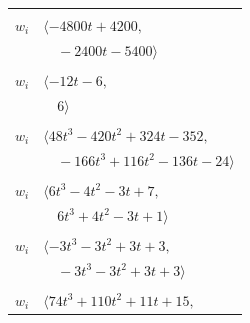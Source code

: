 \documentclass[11pt]{article}
\begin{document}
\begin{longtable}{@{}ll@{}}
\addlinespace[2pt]
\multicolumn{2}{@{}p{0.97\textwidth}@{}}{$i=38$, $D_i=16$, $e_i=0$, $\rho_{ij}$: $7{:}3, \allowbreak 9{:}2, \allowbreak 35{:}3, \allowbreak 36{:}2, \allowbreak 40{:}2, \allowbreak 46{:}3$}\\
$w_i$ & $\langle -4800t+4200,$\\
 & $\quad -2400t-5400\rangle$\\
\addlinespace[2pt]
\multicolumn{2}{@{}p{0.97\textwidth}@{}}{$i=39$, $D_i=1$, $\rho_{ij}$: $0{:}1, \allowbreak 17{:}1, \allowbreak 28{:}1, \allowbreak 31{:}2, \allowbreak 37{:}1, \allowbreak 42{:}1, \allowbreak 43{:}2, \allowbreak 45{:}3$}\\
$w_i$ & $\langle -12t-6,$\\
 & $\quad 6\rangle$\\
\addlinespace[2pt]
\multicolumn{2}{@{}p{0.97\textwidth}@{}}{$i=40$, $D_i=1$, $\rho_{ij}$: $2{:}2, \allowbreak 6{:}3, \allowbreak 17{:}1, \allowbreak 19{:}1, \allowbreak 20{:}3, \allowbreak 23{:}3, \allowbreak 24{:}2, \allowbreak 27{:}3, \allowbreak 30{:}1, \allowbreak 37{:}3, \allowbreak 38{:}2, \allowbreak 46{:}2$}\\
$w_i$ & $\langle 48t^{3}-420t^{2}+324t-352,$\\
 & $\quad -166t^{3}+116t^{2}-136t-24\rangle$\\
\addlinespace[2pt]
\multicolumn{2}{@{}p{0.97\textwidth}@{}}{$i=41$, $D_i=1$, $\rho_{ij}$: $15{:}1, \allowbreak 18{:}3, \allowbreak 19{:}2, \allowbreak 21{:}1, \allowbreak 24{:}1, \allowbreak 25{:}3, \allowbreak 26{:}3, \allowbreak 29{:}2, \allowbreak 32{:}1, \allowbreak 35{:}1$}\\
$w_i$ & $\langle 6t^{3}-4t^{2}-3t+7,$\\
 & $\quad 6t^{3}+4t^{2}-3t+1\rangle$\\
\addlinespace[2pt]
\multicolumn{2}{@{}p{0.97\textwidth}@{}}{$i=42$, $D_i=2$, $\rho_{ij}$: $1{:}2, \allowbreak 21{:}2, \allowbreak 26{:}3, \allowbreak 39{:}3$}\\
$w_i$ & $\langle -3t^{3}-3t^{2}+3t+3,$\\
 & $\quad -3t^{3}-3t^{2}+3t+3\rangle$\\
\addlinespace[2pt]
\multicolumn{2}{@{}p{0.97\textwidth}@{}}{$i=43$, $D_i=2$, $\rho_{ij}$: $6{:}1, \allowbreak 8{:}3, \allowbreak 13{:}3, \allowbreak 16{:}3, \allowbreak 17{:}1, \allowbreak 20{:}2, \allowbreak 24{:}3, \allowbreak 27{:}3, \allowbreak 30{:}1, \allowbreak 39{:}2, \allowbreak 45{:}1$}\\
$w_i$ & $\langle 74t^{3}+110t^{2}+11t+15,$\\

\end{longtable}
\end{document}
